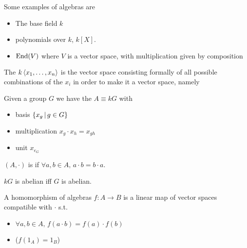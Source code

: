 \documentclass{article}
\begin{document}
\begin{example}
Some examples of algebras are 
\begin{itemize}
    \item The base field $k$
    \item polynomials over $k$, $k[X]$. 
    \item $\operatorname{End}(V)$ where $V$ is a vector space, with multiplication given by composition
\end{itemize}
\end{example}

\begin{example}
The  $k\left\langle x_1, \dots, x_n \right\rangle$ is the vector space consisting formally of all possible combinations of the $x_i$ in order to make it a vector space, namely 
\end{example}

\begin{example}
Given a group $G$ we have the  $A \equiv kG$ with 
\begin{itemize}
    \item basis $\left\{ x_g \, | \, g \in G \right\}$
    \item multiplication $x_g \cdot x_h = x_{gh}$
    \item unit $x_{e_G}$
\end{itemize}
\end{example}

\begin{definition}
$(A,\cdot)$ is  if $\forall a,b \in A, \, a \cdot b = b \cdot a$. 
\end{definition}

\begin{example}
$kG$ is abelian iff $G$ is abelian. 
\end{example}

\begin{definition}
A homomorphism of algebras $f : A \to B$ is a linear map of vector spaces compatible with $\cdot$ s.t. 
\begin{itemize}
    \item $\forall a,b \in A, \, f(a\cdot b ) = f(a) \cdot f(b)$
    \item ($f(1_A) = 1_B$)
\end{itemize}
\end{definition}

\end{document}
